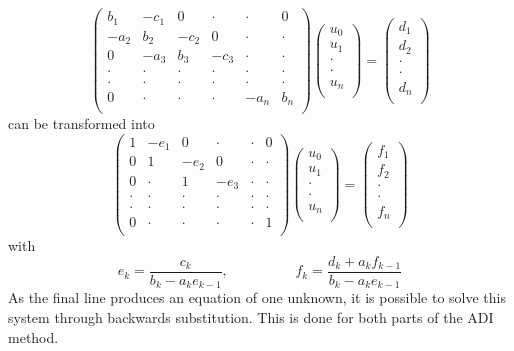 \documentclass{article}
\begin{document}
$$
  \left( \begin{array}{cccccc}
  b_1 & -c_1 & 0 & \cdot & \cdot& 0 \\
  -a_2 & b_2 & -c_2 & 0 & \cdot & \cdot \\
  0 & -a_3 & b_3 & -c_3 & \cdot & \cdot\\
  \cdot & \cdot & \cdot & \cdot & \cdot& \cdot\\
  \cdot & \cdot & \cdot & \cdot & \cdot& \cdot\\
  0 & \cdot& \cdot& \cdot &  -a_n & b_n \\ \end{array} \right)
  \left( \begin{array}{c}
  u_0 \\
  u_1 \\
  \cdot \\
  \cdot \\
  u_n \\ \end{array} \right)
  =
  \left( \begin{array}{c}
  d_1 \\
  d_2 \\
  \cdot \\
  \cdot \\
  d_n \\ \end{array} \right)
$$
can be transformed into
$$
  \left( \begin{array}{cccccc}
  1& -e_1 & 0 & \cdot & \cdot& 0 \\
  0 & 1 & -e_2 & 0 & \cdot & \cdot \\
  0 & \cdot & 1 & -e_3 & \cdot & \cdot\\
  \cdot & \cdot & \cdot & \cdot & \cdot& \cdot\\
  \cdot & \cdot & \cdot & \cdot & \cdot& \cdot\\
  0 & \cdot& \cdot& \cdot &  \cdot & 1 \\ \end{array} \right)
  \left( \begin{array}{c}
  u_0 \\
  u_1 \\
  \cdot \\
  \cdot \\
  u_n \\ \end{array} \right)
  =
  \left( \begin{array}{c}
  f_1 \\
  f_2 \\
  \cdot \\
  \cdot \\
  f_n \\ \end{array} \right)
$$
with
$$
  e_k = \frac{c_k}{b_k - a_k e_{k-1}}, \hspace{2cm} f_k = \frac{d_k + a_k f_{k-1}}{b_k - a_k e_{k-1}}
$$
As the final line produces an equation of one unknown, it is possible to solve this system through
backwards substitution. This is done for both parts of the ADI method.
\end{document}
